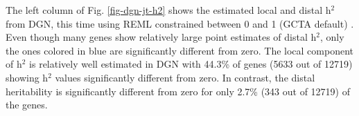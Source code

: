 \documentclass[10pt,letterpaper]{article}
\begin{document}

The left column of Fig. \ref{fig-dgn-jt-h2} shows the estimated local and distal h$^2$ from DGN, this time using REML constrained between 0 and 1 (GCTA default) \cite{Yang_2011}. Even though many genes show relatively large point estimates of distal h$^2$, only the ones colored in blue are significantly different from zero. The local component of h$^2$ is relatively well estimated in DGN with 44.3\% of genes  (5633 out of 12719) showing h$^2$ values significantly different from zero. In contrast, the distal heritability is significantly different from zero for only 2.7\% (343 out of 12719) of the genes. 
\end{document}
